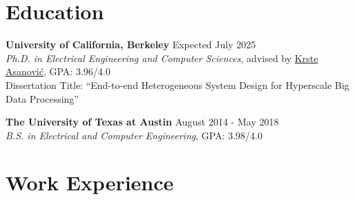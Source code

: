 \documentclass[line]{res}
\begin{document}
\address{\href{https://abejgonzalez.github.io}{https://abejgonzalez.github.io} $|$ \href{mailto:abe.gonzalez@berkeley.edu}{abe.gonzalez@berkeley.edu}}

\begin{resume}

\vspace{-8mm}

\section{\Large{Education}}
\label{sec:education}
\vspace{1mm}

\textbf{University of California, Berkeley} \hfill Expected July 2025
\\
\textit{Ph.D. in Electrical Engineering and Computer Sciences}, advised by \href{https://people.eecs.berkeley.edu/~krste/}{Krste Asanovi\'c}, GPA: 3.96/4.0
\\
Dissertation Title: ``End-to-end Heterogeneous System Design for Hyperscale Big Data Processing''

\vspace{-3mm}

\textbf{The University of Texas at Austin} \hfill August 2014 - May 2018
\\
\textit{B.S. in Electrical and Computer Engineering}, GPA: 3.98/4.0

\vspace{-3mm}

\section{\Large{Work Experience}}
\label{sec:jobs}
\vspace{1mm}


\end{resume}
\end{document}
